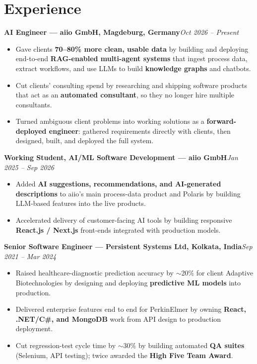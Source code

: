 \documentclass[10pt,a4paper]{article}
\newcommand{\role}[2]{\textbf{#1}\hfill\textit{#2}\par}
\begin{document}
\section*{Experience}
\role{AI Engineer --- aiio GmbH, Magdeburg, Germany}{Oct 2026 -- Present}
\begin{itemize}
\item Gave clients \textbf{70--80\% more clean, usable data} by building and deploying end-to-end \textbf{RAG-enabled multi-agent systems} that ingest process data, extract workflows, and use LLMs to build \textbf{knowledge graphs} and chatbots.
\item Cut clients' consulting spend by researching and shipping software products that act as an \textbf{automated consultant}, so they no longer hire multiple consultants.
\item Turned ambiguous client problems into working solutions as a \textbf{forward-deployed engineer}: gathered requirements directly with clients, then designed, built, and deployed the full system.
\end{itemize}
\role{Working Student, AI/ML Software Development --- aiio GmbH}{Jan 2025 -- Sep 2026}
\begin{itemize}
\item Added \textbf{AI suggestions, recommendations, and AI-generated descriptions} to aiio's main process-data product and Polaris by building LLM-based features into the live products.
\item Accelerated delivery of customer-facing AI tools by building responsive \textbf{React.js / Next.js} front-ends integrated with production models.
\end{itemize}
\vspace{2pt}
\role{Senior Software Engineer --- Persistent Systems Ltd, Kolkata, India}{Sep 2021 -- Mar 2024}
\begin{itemize}
\item Raised healthcare-diagnostic prediction accuracy by $\sim$20\% for client Adaptive Biotechnologies by designing and deploying \textbf{predictive ML models} into production.
\item Delivered enterprise features end to end for PerkinElmer by owning \textbf{React, .NET/C\#, and MongoDB} work from API design to production deployment.
\item Cut regression-test cycle time by $\sim$30\% by building automated \textbf{QA suites} (Selenium, API testing); twice awarded the \textbf{High Five Team Award}.
\end{itemize}
\end{document}

